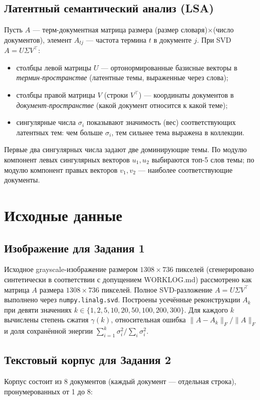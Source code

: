 \documentclass[12pt,a4paper]{article}
\begin{document}
\subsection{Латентный семантический анализ (LSA)}
Пусть $A$ — терм-документная матрица размера (размер словаря)$\times$(число документов),
элемент $A_{tj}$ — частота термина $t$ в документе $j$. При SVD $A=U\Sigma V^\top$:
\begin{itemize}
    \item столбцы левой матрицы $U$ — ортонормированные базисные векторы в
    \emph{термин-пространстве} (латентные темы, выраженные через слова);
    \item столбцы правой матрицы $V$ (строки $V^\top$) — координаты документов в
    \emph{документ-пространстве} (какой документ относится к какой теме);
    \item сингулярные числа $\sigma_i$ показывают значимость (вес) соответствующих
    латентных тем: чем больше $\sigma_i$, тем сильнее тема выражена в коллекции.
\end{itemize}
Первые два сингулярных числа задают две доминирующие темы. По модулю компонент левых
сингулярных векторов $u_1,u_2$ выбираются топ-5 слов темы; по модулю компонент правых
векторов $v_1,v_2$ — наиболее соответствующие документы.

\section{Исходные данные}

\subsection{Изображение для Задания 1}
Исходное grayscale-изображение размером $1308\times 736$ пикселей (сгенерировано
синтетически в соответствии с допущением WORKLOG.md) рассмотрено как матрица
$A$ размера $1308\times 736$ пикселей. Полное SVD-разложение
$A=U\Sigma V^\top$ выполнено через \texttt{numpy.linalg.svd}. Построены усечённые
реконструкции $A_k$ при девяти значениях $k\in\{1,2,5,10,20,50,100,200,300\}$. Для
каждого $k$ вычислены степень сжатия $\gamma(k)$, относительная ошибка
$\|A-A_k\|_F/\|A\|_F$ и доля сохранённой энергии $\sum_{i=1}^k\sigma_i^2/\sum_i\sigma_i^2$.

\subsection{Текстовый корпус для Задания 2}
Корпус состоит из 8 документов (каждый документ — отдельная строка), пронумерованных
от 1 до 8:
\end{document}
